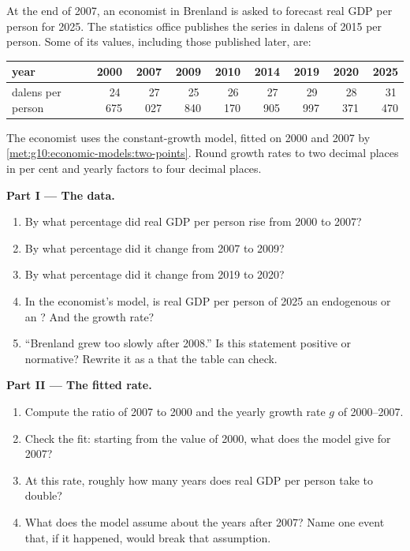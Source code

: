 \begin{problem}
\label{pb:g10:economic-models:1}
At the end of 2007, an economist in Brenland is asked to forecast real GDP per person for 2025. The
statistics office publishes the series in dalens of 2015 per person. Some of its values, including
those published later, are:

\begin{center}
\small
\begin{tabular}{lrrrrrrrr}
\toprule
year & 2000 & 2007 & 2009 & 2010 & 2014 & 2019 & 2020 & 2025 \\
\midrule
dalens per person & 24\,675 & 27\,027 & 25\,840 & 26\,170 & 27\,905 & 29\,997 & 28\,371 & 31\,470 \\
\bottomrule
\end{tabular}
\end{center}

\noindent The economist uses the constant-growth model, fitted on 2000 and 2007 by
\cref{met:g10:economic-models:two-points}. Round growth rates to two decimal places in per cent and
yearly factors to four decimal places.

\medskip
\noindent\textbf{Part I --- The data.}
\begin{enumerate}
\item By what percentage did real GDP per person rise from 2000 to 2007?
\item By what percentage did it change from 2007 to 2009?
\item By what percentage did it change from 2019 to 2020?
\item In the economist's model, is real GDP per person of 2025 an endogenous or an ? And the growth rate?
\item ``Brenland grew too slowly after 2008.'' Is this statement positive or normative? Rewrite it
  as a  that the table can check.
\end{enumerate}

\medskip
\noindent\textbf{Part II --- The fitted rate.}
\begin{enumerate}[resume]
\item Compute the ratio of 2007 to 2000 and the yearly growth rate $g$ of 2000--2007.
\item Check the fit: starting from the value of 2000, what does the model give for 2007?
\item At this rate, roughly how many years does real GDP per person take to double?
\item What does the model assume about the years after 2007? Name one event that, if it happened,
  would break that assumption.
\end{enumerate}


\end{problem}
